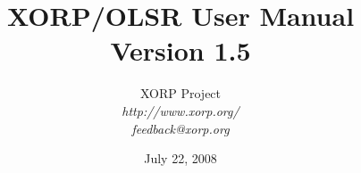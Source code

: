 \documentclass[11pt]{book}
\begin{document}
\title{{\Huge XORP/OLSR User Manual}\\
\vspace{1ex}
Version 1.5}
\author{ XORP Project					\\
         {\it http://www.xorp.org/}			\\
	 {\it feedback@xorp.org}
}
\date{July 22, 2008}

\maketitle


%
%
\newcommand{\xorp}{{\small XORP}\xspace}
\newcommand{\xorpsh}{{\sf\small xorpsh}\xspace}
\newcommand{\rtrmgr}{{\sf\small xorp\_rtrmgr}\xspace}
\newcommand{\stt}{\tt\small}
\newcommand{\ssf}{\sf\small}




\tableofcontents




\end{document}
